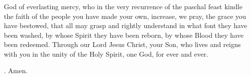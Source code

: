 \lettrine[lines=3]{G}{}od of everlasting mercy,
who in the very recurrence of the paschal feast
kindle the faith of the people you have made your own,
increase, we pray, the grace you have bestowed,
that all may grasp and rightly understand
in what font they have been washed,
by whose Spirit they have been reborn,
by whose Blood they have been redeemed.
Through our Lord Jesus Christ, your Son,
who lives and reigns with you in the unity of the Holy Spirit,
one God, for ever and ever.
\par \Rbar. Amen.

